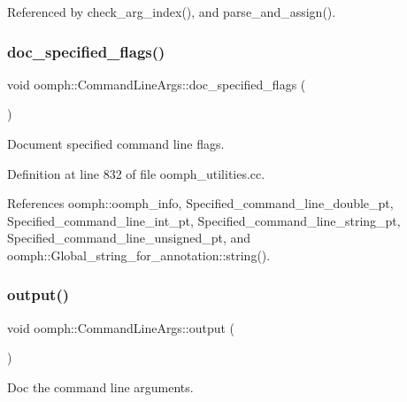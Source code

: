 Referenced by check\+\_\+arg\+\_\+index(), and parse\+\_\+and\+\_\+assign().

\mbox{\label{namespaceoomph_1_1CommandLineArgs_af1a5dba4897b1fa9e9860e457079d988}} 
\subsubsection{\texorpdfstring{doc\+\_\+specified\+\_\+flags()}{doc\_specified\_flags()}}
{\footnotesize\ttfamily void oomph\+::\+Command\+Line\+Args\+::doc\+\_\+specified\+\_\+flags (\begin{DoxyParamCaption}{ }\end{DoxyParamCaption})}



Document specified command line flags. 



Definition at line 832 of file oomph\+\_\+utilities.\+cc.



References oomph\+::oomph\+\_\+info, Specified\+\_\+command\+\_\+line\+\_\+double\+\_\+pt, Specified\+\_\+command\+\_\+line\+\_\+int\+\_\+pt, Specified\+\_\+command\+\_\+line\+\_\+string\+\_\+pt, Specified\+\_\+command\+\_\+line\+\_\+unsigned\+\_\+pt, and oomph\+::\+Global\+\_\+string\+\_\+for\+\_\+annotation\+::string().

\mbox{\label{namespaceoomph_1_1CommandLineArgs_aca07d359a96b9c7b566142112604ea87}} 
\subsubsection{\texorpdfstring{output()}{output()}}
{\footnotesize\ttfamily void oomph\+::\+Command\+Line\+Args\+::output (\begin{DoxyParamCaption}{ }\end{DoxyParamCaption})}



Doc the command line arguments. 



